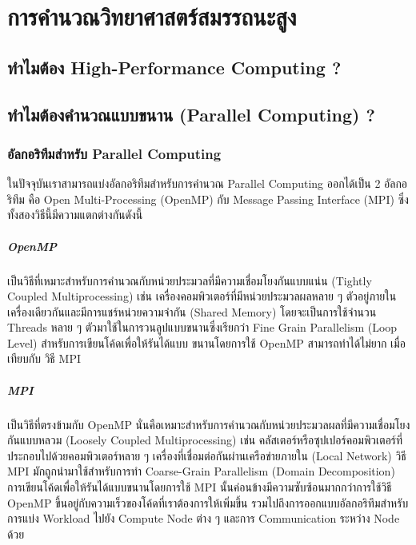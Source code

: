 

\chapter{การคำนวณวิทยาศาสตร์สมรรถนะสูง}
\label{ch:high_perf_comp}

\section{ทำไมต้อง High-Performance Computing ?}

\section{ทำไมต้องคำนวณแบบขนาน (Parallel Computing) ?}

\subsection{อัลกอริทึมสำหรับ Parallel Computing}

ในปัจจุบันเราสามารถแบ่งอัลกอริทึมสำหรับการคำนวณ Parallel Computing ออกได้เป็น 2 อัลกอริทึม คือ Open Multi-Processing (OpenMP)
กับ Message Passing Interface (MPI) ซึ่งทั้งสองวิธีนี้มีความแตกต่างกันดังนี้ 

\paragraph{OpenMP}
เป็นวิธีที่เหมาะสำหรับการคำนวณกับหน่วยประมวลที่มีความเชื่อมโยงกันแบบแน่น (Tightly Coupled Multiprocessing) เช่น 
เครื่องคอมพิวเตอร์ที่มีหน่วยประมวลผลหลาย ๆ ตัวอยู่ภายในเครื่องเดียวกันและมีการแชร์หน่วยความจำกัน (Shared Memory) โดยจะเป็นการใช้จำนวน 
Threads หลาย ๆ ตัวมาใช้ในการวนลูปแบบขนานซึ่งเรียกว่า Fine Grain Parallelism (Loop Level) สำหรับการเขียนโค้ดเพื่อให้รันได้แบบ%
ขนานโดยการใช้ OpenMP สามารถทำได้ไม่ยาก เมื่อเทียบกับ วิธี MPI

\paragraph{MPI} 
เป็นวิธีที่ตรงข้ามกับ OpenMP นั่นคือเหมาะสำหรับการคำนวณกับหน่วยประมวลผลที่มีความเชื่อมโยงกันแบบหลวม (Loosely Coupled Multiprocessing) 
เช่น คลัสเตอร์หรือซุปเปอร์คอมพิวเตอร์ที่ประกอบไปด้วยคอมพิวเตอร์หลาย ๆ เครื่องที่เชื่อมต่อกันผ่านเครือข่ายภายใน (Local Network) วิธี MPI 
มักถูกนำมาใช้สำหรับการทำ Coarse-Grain Parallelism (Domain Decomposition) การเขียนโค้ดเพื่อให้รันได้แบบขนานโดยการใช้ MPI 
นั้นค่อนข้างมีความซับซ้อนมากกว่าการใช้วิธี OpenMP ขึ้นอยู่กับความเร็วของโค้ดที่เราต้องการให้เพิ่มขึ้น รวมไปถึงการออกแบบอัลกอริทึมสำหรับการแบ่ง 
Workload ไปยัง Compute Node ต่าง ๆ และการ Communication ระหว่าง Node ด้วย 

